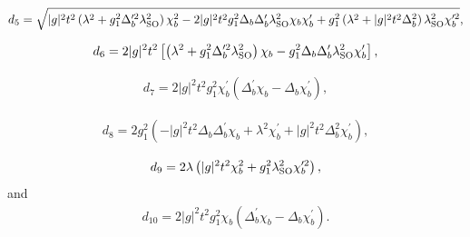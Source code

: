 \documentclass[aps,prb,twocolumn,superscriptaddress,showpacs]{revtex4-1}
\begin{document}
\begin{widetext}
\begin{eqnarray}
d_5 =\sqrt{|g|^2 t^2 \left(\lambda^2+g_1^2 \Delta_{b}^{\prime 2} \lambda_{\rm{SO}}^2\right) \chi _b^2-2 |g|^2 t^2 g_1^2 \Delta _b \Delta_{b}^{\prime} \lambda_{\rm{SO}}^2 \chi _b \chi_{b}^{\prime}+g_1^2 \left(\lambda^2+|g|^2 t^2 \Delta _b^2\right) \lambda_{\rm{SO}}^2 \chi_{b}^{\prime 2}},
\end{eqnarray}

\begin{eqnarray}
d_6=2 |g|^2 t^2 \left[\left(\lambda^2+g_1^2 \Delta_{b}^{\prime 2} \lambda_{\rm{SO}}^2\right) \chi _b-g_1^2 \Delta _b \Delta_{b}^{\prime} \lambda_{\rm{SO}}^2 \chi_{b}^{\prime}\right],
\end{eqnarray}

\begin{eqnarray}
d_7=2 |g|^2 t^2 g_1^2  \chi_{b}^{\prime} \left(\Delta_{b}^{\prime} \chi _b-\Delta _b \chi_{b}^{\prime}\right),
\end{eqnarray}

\begin{eqnarray}
d_8=2 g_1^2  \left(-|g|^2 t^2 \Delta _b \Delta_{b}^{\prime} \chi _b+\lambda^2 \chi_{b}^{\prime}+|g|^2 t^2 \Delta _b^2 \chi_{b}^{\prime}\right),
\end{eqnarray}

\begin{eqnarray}
d_9=2 \lambda \left(|g|^2 t^2 \chi _b^2+g_1^2 \lambda_{\rm{SO}}^2 \chi_{b}^{\prime 2}\right),
\end{eqnarray}
and
\begin{eqnarray}
d_{10}=2 |g|^2 t^2 g_1^2 \chi _b \left(\Delta_{b}^{\prime} \chi _b-\Delta _b \chi_{b}^{\prime}\right).
\end{eqnarray}
\end{widetext}

%

\end{document}
